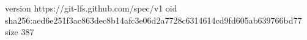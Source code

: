 version https://git-lfs.github.com/spec/v1
oid sha256:aed6e251f3ac863dec8b14afc3e06d2a7728c6314614cd9fd605ab639766bd77
size 387
